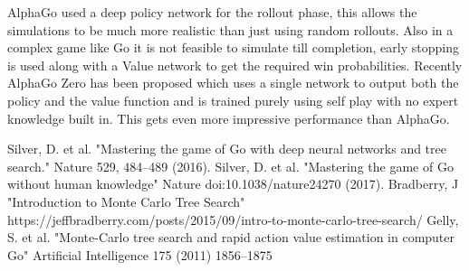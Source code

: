 \documentclass{article}
\begin{document}
AlphaGo \cite{AlphaGo} used a deep policy network for the rollout phase, this allows the simulations to be much more realistic than just using random rollouts. Also in a complex game like Go it is not feasible to simulate till completion, early stopping is used along with a Value network to get the required win probabilities. Recently AlphaGo Zero \cite{AlphaGoZero} has been proposed which uses a single network to output both the policy and the value function and is trained purely using self play with no expert knowledge built in. This gets even more impressive performance than AlphaGo. 
\begin{thebibliography}{9}

Silver, D. et al. "Mastering the game of Go with deep neural networks and tree  search." 
Nature 529, 484–489 (2016).
Silver, D. et al. "Mastering the game of Go without human knowledge" 
Nature doi:10.1038/nature24270 (2017).
Bradberry, J "Introduction to Monte Carlo Tree Search"
https://jeffbradberry.com/posts/2015/09/intro-to-monte-carlo-tree-search/
Gelly, S. et al. "Monte-Carlo tree search and rapid action value estimation in computer Go"
Artificial Intelligence 175 (2011) 1856–1875
\end{thebibliography}
\end{document}
